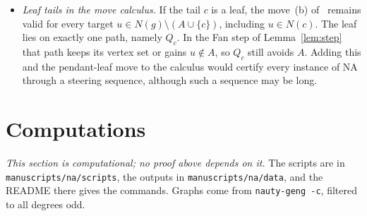 \documentclass[11pt]{amsart}
\theoremstyle{definition}
\begin{document}
\begin{itemize}
\begin{itemize}
\begin{itemize}
    \end{itemize}
  \end{itemize}
\item \emph{Leaf tails in the move calculus.} If the tail $c$ is a leaf, the move~(b)
of~\cite[Thm.~3.1]{L1I} remains valid for every target $u\in N(g)\setminus(A\cup\{c\})$, including
$u\in N(c)$. The leaf lies on exactly one path, namely $Q_c$. In the Fan step of Lemma~\ref{lem:step}
that path keeps its vertex set or gains $u\notin A$, so $Q_c$ still avoids $A$. Adding this and the
pendant-leaf move to the calculus would certify every instance of NA through a steering sequence,
although such a sequence may be long.
\end{itemize}

\section{Computations}\label{sec:comp}

\emph{This section is computational; no proof above depends on it.} The scripts are in
\texttt{manuscripts/na/scripts}, the outputs in \texttt{manuscripts/na/data}, and the README there
gives the commands. Graphs come from \texttt{nauty-geng -c}, filtered to all degrees odd.
\end{document}
